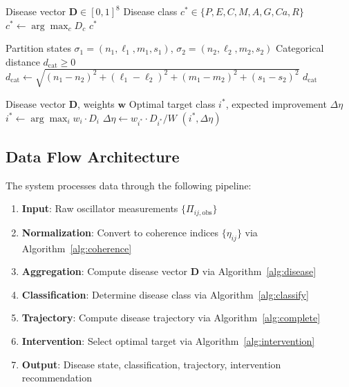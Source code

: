 \documentclass[10pt,twocolumn]{article}
\theoremstyle{plain}
\theoremstyle{definition}
\theoremstyle{remark}
\newcommand{\dcat}{d_{\mathrm{cat}}}
\newcommand{\Dvec}{\mathbf{D}}
\begin{document}
\begin{algorithm}[h]
\caption{CLASSIFY: Geometric disease classification}
\label{alg:classify}
\begin{algorithmic}[1]
\REQUIRE Disease vector $\Dvec \in [0,1]^8$
\ENSURE Disease class $c^* \in \{P, E, C, M, A, G, Ca, R\}$
\STATE $c^* \leftarrow \arg\max_{c} D_c$
\RETURN $c^*$
\end{algorithmic}
\end{algorithm}

\begin{algorithm}[h]
\caption{CATEGORICAL\_DISTANCE: Compute partition distance}
\label{alg:distance}
\begin{algorithmic}[1]
\REQUIRE Partition states $\sigma_1 = (n_1, \ell_1, m_1, s_1)$, $\sigma_2 = (n_2, \ell_2, m_2, s_2)$
\ENSURE Categorical distance $\dcat \geq 0$
\STATE $\dcat \leftarrow \sqrt{(n_1 - n_2)^2 + (\ell_1 - \ell_2)^2 + (m_1 - m_2)^2 + (s_1 - s_2)^2}$
\RETURN $\dcat$
\end{algorithmic}
\end{algorithm}

\begin{algorithm}[h]
\caption{INTERVENTION: Compute optimal therapeutic target}
\label{alg:intervention}
\begin{algorithmic}[1]
\REQUIRE Disease vector $\Dvec$, weights $\mathbf{w}$
\ENSURE Optimal target class $i^*$, expected improvement $\Delta\eta$
\STATE $i^* \leftarrow \arg\max_{i} w_i \cdot D_i$
\STATE $\Delta\eta \leftarrow w_{i^*} \cdot D_{i^*} / W$
\RETURN $(i^*, \Delta\eta)$
\end{algorithmic}
\end{algorithm}

\subsection{Data Flow Architecture}

The system processes data through the following pipeline:

\begin{enumerate}[label=\arabic*.]
\item \textbf{Input}: Raw oscillator measurements $\{\Pi_{ij,\mathrm{obs}}\}$
\item \textbf{Normalization}: Convert to coherence indices $\{\eta_{ij}\}$ via Algorithm~\ref{alg:coherence}
\item \textbf{Aggregation}: Compute disease vector $\Dvec$ via Algorithm~\ref{alg:disease}
\item \textbf{Classification}: Determine disease class via Algorithm~\ref{alg:classify}
\item \textbf{Trajectory}: Compute disease trajectory via Algorithm~\ref{alg:complete}
\item \textbf{Intervention}: Select optimal target via Algorithm~\ref{alg:intervention}
\item \textbf{Output}: Disease state, classification, trajectory, intervention recommendation
\end{enumerate}
\end{document}
